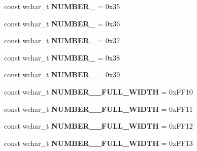\begin{DoxyCompactItemize}
\item 
\hypertarget{group___indexing_gaa3645eba391960dc96a45d2815bd1fb7}{const wchar\-\_\-t {\bfseries N\-U\-M\-B\-E\-R\-\_} = 0x35}\label{group___indexing_gaa3645eba391960dc96a45d2815bd1fb7}

\item 
\hypertarget{group___indexing_ga9840dc9b1683256d15aacbf969e26cc0}{const wchar\-\_\-t {\bfseries N\-U\-M\-B\-E\-R\-\_} = 0x36}\label{group___indexing_ga9840dc9b1683256d15aacbf969e26cc0}

\item 
\hypertarget{group___indexing_ga5ad44f1f3e6083f33b41e9309ef10a5c}{const wchar\-\_\-t {\bfseries N\-U\-M\-B\-E\-R\-\_} = 0x37}\label{group___indexing_ga5ad44f1f3e6083f33b41e9309ef10a5c}

\item 
\hypertarget{group___indexing_gaeb3435812810644b35c7e3dadf16818b}{const wchar\-\_\-t {\bfseries N\-U\-M\-B\-E\-R\-\_} = 0x38}\label{group___indexing_gaeb3435812810644b35c7e3dadf16818b}

\item 
\hypertarget{group___indexing_gacb94fe62894cfcfaadfbe898b1a5afb1}{const wchar\-\_\-t {\bfseries N\-U\-M\-B\-E\-R\-\_} = 0x39}\label{group___indexing_gacb94fe62894cfcfaadfbe898b1a5afb1}

\item 
\hypertarget{group___indexing_gacd909bf295b3cef9d8969116a1e155f7}{const wchar\-\_\-t {\bfseries N\-U\-M\-B\-E\-R\-\_\-\_\-\-F\-U\-L\-L\-\_\-\-W\-I\-D\-T\-H} = 0x\-F\-F10}\label{group___indexing_gacd909bf295b3cef9d8969116a1e155f7}

\item 
\hypertarget{group___indexing_gaaafcb45e11eab5249cef711774c09d40}{const wchar\-\_\-t {\bfseries N\-U\-M\-B\-E\-R\-\_\-\_\-\-F\-U\-L\-L\-\_\-\-W\-I\-D\-T\-H} = 0x\-F\-F11}\label{group___indexing_gaaafcb45e11eab5249cef711774c09d40}

\item 
\hypertarget{group___indexing_ga67980236de0dc25e0b184ff74bcb3221}{const wchar\-\_\-t {\bfseries N\-U\-M\-B\-E\-R\-\_\-\_\-\-F\-U\-L\-L\-\_\-\-W\-I\-D\-T\-H} = 0x\-F\-F12}\label{group___indexing_ga67980236de0dc25e0b184ff74bcb3221}

\item 
\hypertarget{group___indexing_gab683af4f3453a99ceea045541f0142c2}{const wchar\-\_\-t {\bfseries N\-U\-M\-B\-E\-R\-\_\-\_\-\-F\-U\-L\-L\-\_\-\-W\-I\-D\-T\-H} = 0x\-F\-F13}\label{group___indexing_gab683af4f3453a99ceea045541f0142c2}


\end{DoxyCompactItemize}
